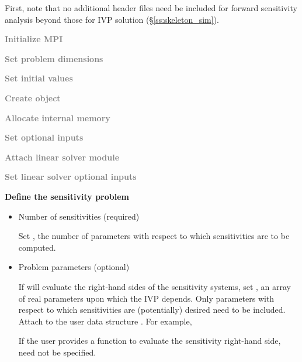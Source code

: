 First, note that no additional header files need be included for forward sensitivity 
analysis beyond those for IVP solution (\S\ref{ss:skeleton_sim}).
\begin{Steps}
  
\item 
  \textcolor{gray}{\bf {\p} Initialize MPI}

\item
  \textcolor{gray}{\bf Set problem dimensions}

\item
  \textcolor{gray}{\bf Set initial values}
 
\item
  \textcolor{gray}{\bf Create {\idas} object}

\item
  \textcolor{gray}{\bf Allocate internal memory}

\item
  \textcolor{gray}{\bf Set optional inputs}

\item
  \textcolor{gray}{\bf Attach linear solver module}

\item
  \textcolor{gray}{\bf Set linear solver optional inputs}

\item \label{i:fwd_start}
  {\bf Define the sensitivity problem}

  \begin{itemize}

    \item Number of sensitivities (required)

      Set , the number of parameters with respect to which sensitivities
      are to be computed.
  
    \item Problem parameters (optional)

      If {\idas} will evaluate the right-hand sides of the sensitivity 
      systems, set , an array of  real parameters upon which the IVP 
      depends. Only parameters with respect to which sensitivities are (potentially) 
      desired need to be included. 
      Attach  to the user data structure . 
      For example, 

      If the user provides a function to evaluate the sensitivity right-hand side,
       need not be specified.


\end{itemize}
\end{Steps}

